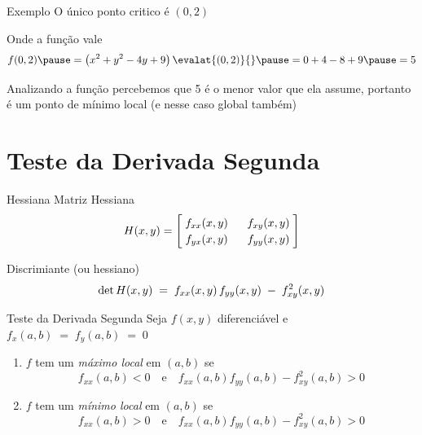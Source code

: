 \begin{frame}{Exemplo \theexemplo}
  O único ponto critico é \((0, 2)\)

  \pause
  \vspace{\baselineskip}
  Onde a função vale
  \[
    f(0, 2)
    \pause
    = \left(x^2 + y^2 - 4y + 9\right)\evalat{(0, 2)}{}
    \pause
    = 0 + 4 - 8 + 9
    \pause
    = 5
  \]

  \pause
  \vspace{\baselineskip}
  Analizando a função percebemos que 5 é o menor valor que ela assume,
  portanto é um ponto de mínimo local (e nesse caso global também)
\end{frame}

\section{Teste da Derivada Segunda}

\begin{frame}{Hessiana}
  Matriz Hessiana
  \[
    \arraycolsep=2mm
    \def\arraystretch{1.2}
    H(x, y) = \begin{bmatrix}
      \null\;f_{xx}(x, y)\;\null & \null\;f_{xy}(x, y)\;\null \\
      f_{yx}(x, y) & f_{yy}(x, y)
    \end{bmatrix}
  \]

  \pause
  \vspace{\baselineskip}
  Discrimiante (ou hessiano)
  \[
    \arraycolsep=2mm
    \def\arraystretch{1.2}
    \det H(x, y) \;=\; f_{xx}(x, y)\,f_{yy}(x, y) \;-\; f_{xy}^2(x, y)
  \]
\end{frame}

\begin{frame}{Teste da Derivada Segunda}
  Seja $f(x, y)$ diferenciável e
  \(
    f_x(a, b) \;=\; f_y(a, b) \;=\; 0
  \)

  \pause
  \vspace{\baselineskip}
  \begin{enumerate}[<+->]
    \item $f$ tem um \emph{máximo local} em $(a, b)$ se
    \[
      f_{xx}(a, b) \bm{<} 0
      \quad\text{e}\quad
      f_{xx}(a, b) f_{yy}(a, b) - f^2_{xy}(a, b) \bm{>} 0
    \]
    \item $f$ tem um \emph{mínimo local} em $(a, b)$ se
    \[
      f_{xx}(a, b) \bm{>} 0
      \quad\text{e}\quad
      f_{xx}(a, b) f_{yy}(a, b) - f^2_{xy}(a, b) \bm{>} 0
    \]
  \end{enumerate}
\end{frame}

